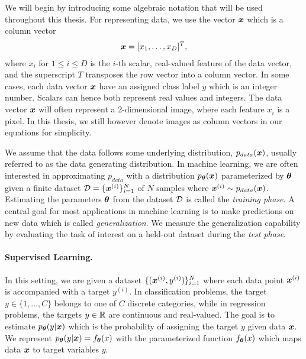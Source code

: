 We will begin by introducing some algebraic notation that will be used throughout this thesis. For representing data, we use the vector ${\bm{x}}$ which is a column vector 
\begin{align*}
	{\bm{x}} = [x_1, \dots, x_D]^T,
\end{align*}
where $x_i$ for $1 \leq i \leq D$ is the $i$-th scalar, real-valued feature of the data vector, and the superscript $T$ transposes the row vector into a column vector. In some cases, each data vector ${\bm{x}}$ have an assigned class label $y$ which is an integer number. Scalars can hence both represent real values and integers. The data vector ${\bm{x}}$ will often represent a 2-dimensional image, where each feature $x_i$ is a pixel. In this thesis, we still however denote images as column vectors in our equations for simplicity. 

We assume that the data follows some underlying distribution, $p_{data}({\bm{x}})$, usually referred to as the data generating distribution. In machine learning, we are often interested in approximating $p_{data}$ with a distribution $p_{{\bm{\theta}}}({\bm{x}})$ parameterized by ${\bm{\theta}}$ given a finite dataset ${\mathcal{D}} = \{{\bm{x}}^{(i)}\}_{i=1}^{N}$ of $N$ samples where ${\bm{x}}^{(i)} \sim p_{data}({\bm{x}})$. Estimating the parameters ${\bm{\theta}}$ from the dataset ${\mathcal{D}}$ is called the \textit{training phase}. A central goal for most applications in machine learning is to make predictions on new data which is called \textit{generalization}. We measure the generalization capability by evaluating the task of interest on a held-out dataset during the \textit{test phase}.

\vspace{-3mm}
\paragraph{Supervised Learning.} In this setting, we are given a dataset $\{({\bm{x}}^{(i)}, y^{(i)})\}_{i=1}^{N}$ where each data point ${\bm{x}}^{(i)}$ is accompanied with a target $y^{(i)}$. In classification problems, the target $y \in \{1, \dots, C\}$ belongs to one of $C$ discrete categories, while in regression problems, the targets $y \in \mathbb{R}$ are continuous and real-valued. The goal is to estimate $p_{{\bm{\theta}}}(y | {\bm{x}})$ which is the probability of assigning the target $y$ given data ${\bm{x}}$. We represent $p_{{\bm{\theta}}}(y | {\bm{x}}) = f_{{\bm{\theta}}}(x)$ with the parameterized function $f_{{\bm{\theta}}}(x)$ which maps data ${\bm{x}}$ to target variables $y$.  


